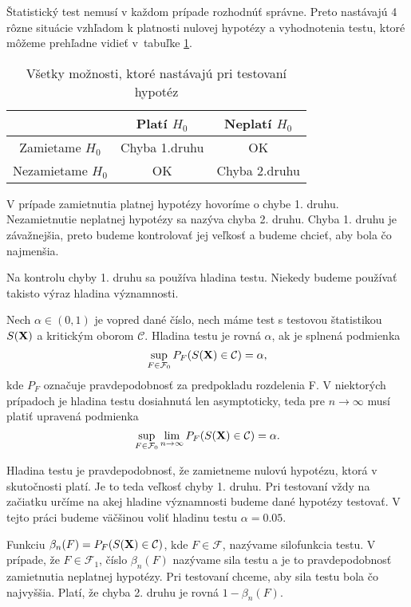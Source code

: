 Štatistický test nemusí v každom prípade rozhodnúť správne. 
Preto nastávajú 4 rôzne situácie vzhľadom k platnosti nulovej hypotézy a vyhodnotenia testu, 
ktoré môžeme prehľadne vidieť v~tabuľke \ref{tab01:1}. 

\begin{table}[h!]
  \centering
  \begin{tabular}{|c|c|c|}
    \hline
     & Platí $H_0$ & Neplatí $H_0$ \\ \hline
    Zamietame $H_0$ & Chyba 1.druhu & OK \\ \hline
    Nezamietame $H_0$ & OK & Chyba 2.druhu \\ \hline
  \end{tabular}
  \caption{Všetky možnosti, ktoré nastávajú pri testovaní hypotéz}
  \label{tab01:1}
\end{table}

V prípade zamietnutia platnej hypotézy hovoríme o chybe 1. druhu. 
Nezamietnutie neplatnej hypotézy sa nazýva chyba 2. druhu. 
Chyba 1. druhu je závažnejšia, preto budeme kontrolovať jej veľkosť a budeme chcieť, aby bola čo najmenšia.

Na kontrolu chyby 1. druhu sa používa hladina testu. Niekedy budeme používať takisto výraz hladina významnosti. 

\begin{definicia}\label{def3}
  Nech $\alpha \in (0,1)$ je vopred dané číslo, nech máme test s testovou štatistikou $S({\bf X})$ a kritickým oborom $\mathcal{C}$. 
  Hladina testu je rovná $\alpha$, ak je splnená podmienka $$ \sup_{F \in \mathcal{F}_0} P_F (S({\bf X}) \in \mathcal{C}) = \alpha, $$
  kde $P_F$  označuje pravdepodobnosť za predpokladu rozdelenia F.  
  V niektorých prípadoch je hladina testu dosiahnutá len asymptoticky, teda pre $n \longrightarrow \infty$ musí platiť upravená podmienka 
  $$ \sup_{F \in \mathcal{F}_0} \lim_{n \rightarrow \infty} P_F (S({\bf X}) \in \mathcal{C}) = \alpha. $$
\end{definicia}  

Hladina testu je pravdepodobnosť, že zamietneme nulovú hypotézu, ktorá v skutočnosti platí. 
Je to teda veľkosť chyby 1. druhu. 
Pri testovaní vždy na začiatku určíme na akej hladine významnosti budeme dané hypotézy testovať. 
V tejto práci budeme väčšinou voliť hladinu testu $\alpha=0.05$. 

Funkciu $\beta_n(F) = P_F (S({\bf X}) \in \mathcal{C})$, kde $F \in \mathcal{F}$, nazývame silofunkcia testu. 
V prípade, že $F \in \mathcal{F}_1$, číslo $\beta_n(F)$ nazývame sila testu a je to pravdepodobnosť zamietnutia neplatnej hypotézy. 
Pri testovaní chceme, aby sila testu bola čo najvyššia. Platí, že chyba 2. druhu je rovná $1-\beta_n(F)$. 

